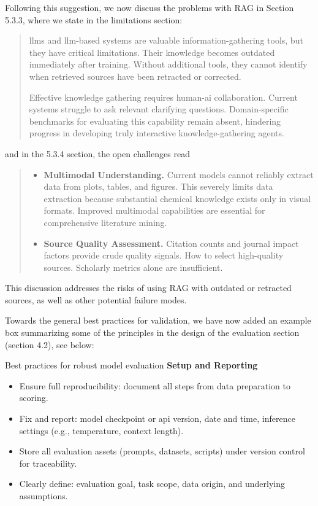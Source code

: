 \begin{reply}
Following this suggestion, we now discuss the problems with RAG in Section 5.3.3, where we state in the limitations section:
\begin{quote}
\Glspl{llm} and \gls{llm}-based systems are valuable information-gathering tools, but they have critical limitations. Their knowledge becomes outdated immediately after training. Without additional tools, they cannot identify when retrieved sources have been retracted or corrected. 

Effective knowledge gathering requires human-\gls{ai} collaboration. Current systems struggle to ask relevant clarifying questions.\autocite{choudhury2025bed0llm0} Domain-specific benchmarks for evaluating this capability remain absent, hindering progress in developing truly interactive knowledge-gathering agents.
\end{quote}

and in the 5.3.4 section, the open challenges read

\begin{quote}
\begin{itemize}
    \item \textbf{Multimodal Understanding.} Current models cannot reliably extract data from plots, tables, and figures.\autocite{alampara2024probing,gupta2022discomat0} This severely limits data extraction because substantial chemical knowledge exists only in visual formats. Improved multimodal capabilities are essential for comprehensive literature mining.
    
    \item \textbf{Source Quality Assessment.} Citation counts and journal impact factors provide crude quality signals. How to select high-quality sources. Scholarly metrics alone are insufficient.
\end{itemize}

\end{quote}

This discussion addresses the risks of using RAG with outdated or retracted sources, as well as other potential failure modes.

Towards the general best practices for validation, we have now added an example box summarizing some of the principles in the design of the evaluation section (section 4.2), see below:

\begin{examplebox}[label={example:best_practices}]{Best practices for robust model evaluation}
\textbf{Setup and Reporting}
\begin{itemize}
    \item Ensure full reproducibility: document all steps from data preparation to scoring.
    \item Fix and report: model checkpoint or \gls{api} version, date and time, inference settings (e.g., temperature, context length).
    \item Store all evaluation assets (prompts, datasets, scripts) under version control for traceability.
    \item Clearly define: evaluation goal, task scope, data origin, and underlying assumptions.
\end{itemize}


\end{examplebox}
\end{reply}

